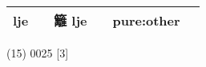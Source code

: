 \documentclass[14pt,a4paper]{scrartcl}
\begin{document}
\begin{longtable}[c]{@{}llllll@{}}
\begin{minipage}[t]{0.14\columnwidth}
lje
\strut\end{minipage} &
\begin{minipage}[t]{0.14\columnwidth}\raggedright\strut
\strut\end{minipage} &
\begin{minipage}[t]{0.14\columnwidth}\raggedright\strut
籬 lje
\strut\end{minipage} &
\begin{minipage}[t]{0.14\columnwidth}\raggedright\strut
\strut\end{minipage} &
\begin{minipage}[t]{0.14\columnwidth}\raggedright\strut
pure:other
\strut\end{minipage}\tabularnewline
\bottomrule
\end{longtable}

(15) 0025 {[}3{]}
\end{document}
